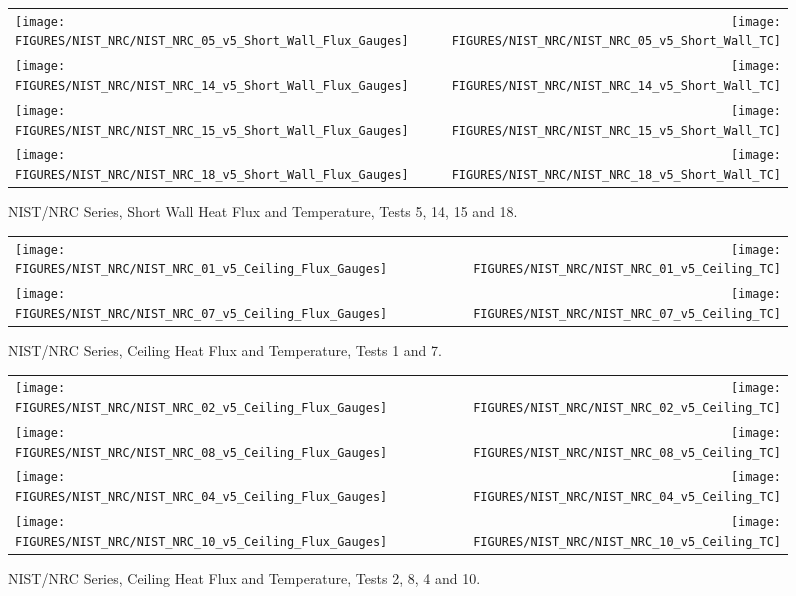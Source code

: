 \begin{figure}[p]
\begin{tabular*}{\textwidth}{l@{\extracolsep{\fill}}r}
\texttt{[image: FIGURES/NIST\_NRC/NIST\_NRC\_05\_v5\_Short\_Wall\_Flux\_Gauges]} &
\texttt{[image: FIGURES/NIST\_NRC/NIST\_NRC\_05\_v5\_Short\_Wall\_TC]} \\
\texttt{[image: FIGURES/NIST\_NRC/NIST\_NRC\_14\_v5\_Short\_Wall\_Flux\_Gauges]} &
\texttt{[image: FIGURES/NIST\_NRC/NIST\_NRC\_14\_v5\_Short\_Wall\_TC]} \\
\texttt{[image: FIGURES/NIST\_NRC/NIST\_NRC\_15\_v5\_Short\_Wall\_Flux\_Gauges]} &
\texttt{[image: FIGURES/NIST\_NRC/NIST\_NRC\_15\_v5\_Short\_Wall\_TC]} \\
\texttt{[image: FIGURES/NIST\_NRC/NIST\_NRC\_18\_v5\_Short\_Wall\_Flux\_Gauges]} &
\texttt{[image: FIGURES/NIST\_NRC/NIST\_NRC\_18\_v5\_Short\_Wall\_TC]}
\end{tabular*}
\caption{NIST/NRC Series, Short Wall Heat Flux and Temperature, Tests 5, 14, 15 and 18.}
\label{NIST_NRC_Short_4}
\end{figure}

\clearpage


\begin{figure}[h!]
\begin{tabular*}{\textwidth}{l@{\extracolsep{\fill}}r}
\texttt{[image: FIGURES/NIST\_NRC/NIST\_NRC\_01\_v5\_Ceiling\_Flux\_Gauges]} &
\texttt{[image: FIGURES/NIST\_NRC/NIST\_NRC\_01\_v5\_Ceiling\_TC]} \\
\texttt{[image: FIGURES/NIST\_NRC/NIST\_NRC\_07\_v5\_Ceiling\_Flux\_Gauges]} &
\texttt{[image: FIGURES/NIST\_NRC/NIST\_NRC\_07\_v5\_Ceiling\_TC]}

\end{tabular*}
\caption{NIST/NRC Series, Ceiling Heat Flux and Temperature, Tests 1 and 7.}
\label{NIST_NRC_Ceiling_1}
\end{figure}

\begin{figure}[p]
\begin{tabular*}{\textwidth}{l@{\extracolsep{\fill}}r}
\texttt{[image: FIGURES/NIST\_NRC/NIST\_NRC\_02\_v5\_Ceiling\_Flux\_Gauges]} &
\texttt{[image: FIGURES/NIST\_NRC/NIST\_NRC\_02\_v5\_Ceiling\_TC]} \\
\texttt{[image: FIGURES/NIST\_NRC/NIST\_NRC\_08\_v5\_Ceiling\_Flux\_Gauges]} &
\texttt{[image: FIGURES/NIST\_NRC/NIST\_NRC\_08\_v5\_Ceiling\_TC]} \\
\texttt{[image: FIGURES/NIST\_NRC/NIST\_NRC\_04\_v5\_Ceiling\_Flux\_Gauges]} &
\texttt{[image: FIGURES/NIST\_NRC/NIST\_NRC\_04\_v5\_Ceiling\_TC]} \\
\texttt{[image: FIGURES/NIST\_NRC/NIST\_NRC\_10\_v5\_Ceiling\_Flux\_Gauges]} &
\texttt{[image: FIGURES/NIST\_NRC/NIST\_NRC\_10\_v5\_Ceiling\_TC]}

\end{tabular*}
\caption{NIST/NRC Series, Ceiling Heat Flux and Temperature, Tests 2, 8, 4 and 10.}
\label{NIST_NRC_Ceiling_2}
\end{figure}


